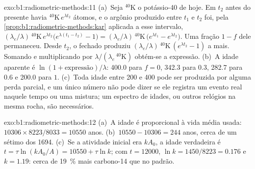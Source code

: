 \begin{solution}{exo:b1:radiometric-methods:11}
(a)~Seja ${}^{40}\mathrm{K}$ o potássio-40 de hoje. Em $t_2$ antes do presente havia
${}^{40}\mathrm{K}\,e^{\lambda t_2}$ átomos, e o argônio produzido entre $t_1$ e $t_2$ foi,
pela \cref{prop:b1:radiometric-methods:kar} aplicada a esse intervalo, $(\lambda_e/\lambda)\,{}^{40}\mathrm{K}\,e^{\lambda
t_2}\bigl(e^{\lambda (t_1 - t_2)} - 1\bigr) = (\lambda_e/\lambda)\,
{}^{40}\mathrm{K}\,\bigl(e^{\lambda t_1} - e^{\lambda t_2}\bigr)$. Uma fração $1 - f$ dele
permaneceu. Desde $t_2$, o  fechado produziu $(\lambda_e/\lambda)\,{}^{40}\mathrm{K}\,(e^{\lambda t_2} - 1)$
a mais. Somando e multiplicando por $\lambda/(\lambda_e\,{}^{40}\mathrm{K})$ obtém-se a expressão.
(b)~A idade aparente é $\ln(1 + \text{expressão})/\lambda$: \qty{400.0}{\Myr} para $f = 0$,
\qty{342.3}{\Myr} para $0.3$, \qty{282.7}{\Myr} para $0.6$ e \qty{200.0}{\Myr} para $1$.
(c)~Toda idade entre \qty{200}{\Myr} e \qty{400}{\Myr} pode ser produzida por alguma perda
parcial, e um único número não pode dizer se ele registra um evento real naquele tempo ou uma
mistura; um espectro de idades, ou outros relógios na mesma rocha, são necessários.
\end{solution}

\begin{solution}{exo:b1:radiometric-methods:12}
(a)~A idade é proporcional à vida média usada: $10306 \times 8223/8033 =
\num{10550}$ anos. (b)~$10550 - 10306 = 244$ anos, cerca de um sétimo dos
\num{1694}. (c)~Se a atividade inicial era $k A_0$, a idade verdadeira é $t = \tau
\ln(k A_0/A) = \num{10550} + \tau \ln k$; com $t = \num{12000}$, $\ln k =
1450/8223 = 0.176$ e $k = 1.19$: cerca de \qty{19}{\percent} mais carbono-14 que
no padrão.
\end{solution}

